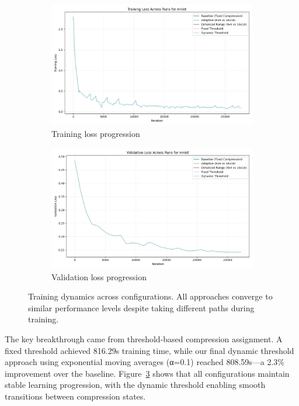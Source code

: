\documentclass{article} %
\begin{document}
\begin{figure}[t]
\centering
\begin{subfigure}{0.49\textwidth}
    \includegraphics[width=\textwidth]{train_loss_mnist_across_runs.png}
    \caption{Training loss progression}
    \label{fig:train_loss}
\end{subfigure}
\begin{subfigure}{0.49\textwidth}
    \includegraphics[width=\textwidth]{val_loss_mnist_across_runs.png}
    \caption{Validation loss progression}
    \label{fig:val_loss}
\end{subfigure}
\caption{Training dynamics across configurations. All approaches converge to similar performance levels despite taking different paths during training.}
\label{fig:training}
\end{figure}

The key breakthrough came from threshold-based compression assignment. A fixed threshold achieved 816.29s training time, while our final dynamic threshold approach using exponential moving averages (α=0.1) reached 808.59s---a 2.3\% improvement over the baseline. Figure~\ref{fig:training} shows that all configurations maintain stable learning progression, with the dynamic threshold enabling smooth transitions between compression states.
\end{document}
